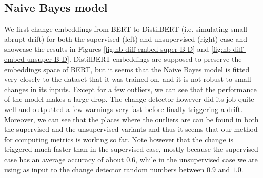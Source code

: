 \documentclass[12pt]{extreport}
\begin{document}
\subsection{Naive Bayes model}

We first change embeddings from BERT to DistilBERT (i.e. simulating small abrupt drift) for both the supervised (left) and unsupervised (right) case and showcase the results in Figures \ref{fig:nb-diff-embed-super-B-D} and \ref{fig:nb-diff-embed-unsuper-B-D}. DistilBERT embeddings are supposed to preserve the embeddings space of BERT, but it seems that the Naive Bayes model is fitted very closely to the dataset that it was trained on, and it is not robust to small changes in its inputs. Except for a few outliers, we can see that the performance of the model makes a large drop. The change detector however did its job quite well and outputted a few warnings very fast before finally triggering a drift. Moreover, we can see that the places where the outliers are can be found in both the supervised and the unsupervised variants and thus it seems that our method for computing metrics is working so far. Note however that the change is triggered much faster than in the supervised case, mostly because the supervised case has an average accuracy of about $0.6$, while in the unsupervised case we are using as input to the change detector random numbers between $0.9$ and $1.0$.
\end{document}
